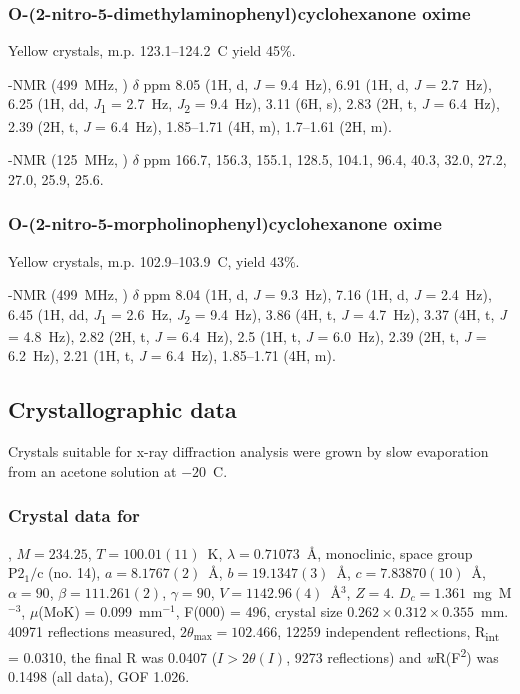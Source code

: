 \begin{refsection}
\subsubsection{O-(2-nitro-5-dimethylaminophenyl)cyclohexanone oxime }

Yellow crystals, m.p. 123.1--124.2~\degree{}C yield 45\%.

-NMR (499~MHz, ) $\delta$ ppm 8.05 (1H, d, \textit{J} = 9.4~Hz), 6.91 (1H, d, \textit{J} = 2.7~Hz), 6.25 (1H, dd, \textit{J}\textsubscript{1} = 2.7~Hz, \textit{J}\textsubscript{2} = 9.4~Hz), 3.11 (6H, s), 2.83 (2H, t, \textit{J} = 6.4~Hz), 2.39 (2H, t, \textit{J} = 6.4~Hz), 1.85--1.71 (4H, m), 1.7--1.61 (2H, m).

-NMR (125~MHz, ) $\delta$ ppm 166.7, 156.3, 155.1, 128.5, 104.1, 96.4, 40.3, 32.0, 27.2, 27.0, 25.9, 25.6.

\subsubsection{O-(2-nitro-5-morpholinophenyl)cyclohexanone oxime }

Yellow crystals, m.p. 102.9--103.9~\degree{}C, yield 43\%.

-NMR (499~MHz, ) $\delta$ ppm 8.04 (1H, d, \textit{J} = 9.3~Hz), 7.16 (1H, d, \textit{J} = 2.4~Hz), 6.45 (1H, dd, \textit{J}\textsubscript{1} = 2.6~Hz, \textit{J}\textsubscript{2} = 9.4~Hz), 3.86 (4H, t, \textit{J} = 4.7~Hz), 3.37 (4H, t, \textit{J} = 4.8~Hz), 2.82 (2H, t, \textit{J} = 6.4~Hz), 2.5 (1H, t, \textit{J} = 6.0~Hz), 2.39 (2H, t, \textit{J} = 6.2~Hz), 2.21 (1H, t, \textit{J} = 6.4~Hz), 1.85--1.71 (4H, m).

\subsection{Crystallographic data}
Crystals suitable for x-ray diffraction analysis were grown by slow evaporation from an acetone solution at $-20$~\degree{}C.

\subsubsection{Crystal data for \texorpdfstring{}{C12 H14 N2 O3}}
, $M=234.25$, $T=100.01(11)$~K, $\lambda=0.71073$~\AA, monoclinic, space group $\text{P}2_1/\text{c}$ (no. 14), $a = 8.1767(2)$~\AA, $b = 19.1347(3)$~\AA, $c = 7.83870(10)$~\AA, $\alpha = 90$\degree, $\beta = 111.261(2)$\degree, $\gamma = 90$\degree, $V = 1142.96(4)$~\AA$^{3}$, $Z = 4$. $D_{c}= 1.361$~mg~M$^{-3}$, $\mu$(MoK\a) = 0.099~mm$^{-1}$, F(000) = 496, crystal size $0.262 \times 0.312 \times 0.355$~mm. 40971 reflections measured, $2\theta_{\max}=102.466$\degree, 12259 independent reflections, R\textsubscript{int} = 0.0310, the final R was 0.0407 ($I > 2\theta(I)$, 9273 reflections) and \emph{w}R(F\textsuperscript{2}) was 0.1498 (all data), GOF 1.026. 


\end{refsection}

